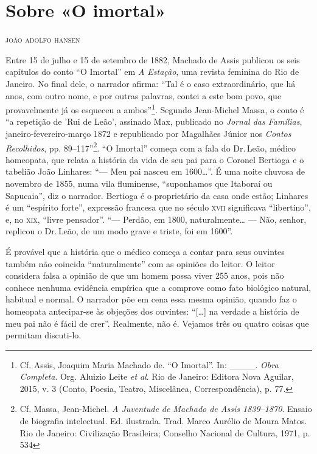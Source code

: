 \chapter[Sobre «O imortal», \emph{por João Adolfo Hansen}]{Sobre «O imortal»} %

\begin{flushright}
\textsc{joão adolfo hansen}
\end{flushright}

\noindent{}Entre 15 de julho e 15 de setembro de 1882, Machado de Assis publicou os
seis capítulos do conto ``O Imortal'' em \emph{A Estação}, uma revista
feminina do Rio de Janeiro. No final dele, o narrador afirma: ``Tal é o
caso extraordinário, que há anos, com outro nome, e por outras palavras,
contei a este bom povo, que provavelmente já os esqueceu a
ambos''\footnote{Cf. Assis, Joaquim Maria Machado de. ``O Imortal''. In:
  \_\_\_\_. \emph{Obra Completa}. Org. Aluizio Leite \emph{et al}. Rio
  de Janeiro: Editora Nova Aguilar, 2015, v. 3 (Conto, Poesia, Teatro,
  Miscelânea, Correspondência), p. 77.}. Segundo Jean-Michel Massa, o
conto é ``a repetição de 'Rui de Leão', assinado Max, publicado no
\emph{Jornal das Famílias}, janeiro-fevereiro-março 1872 e republicado
por Magalhães Júnior nos \emph{Contos Recolhidos}, pp. 89--117''\footnote{Cf.
  Massa, Jean-Michel. \emph{A Juventude de Machado de Assis 1839--1870}.
  Ensaio de biografia intelectual. Ed. ilustrada. Trad. Marco Aurélio de
  Moura Matos. Rio de Janeiro: Civilização Brasileira; Conselho Nacional
  de Cultura, 1971, p. 534}. ``O Imortal'' começa com a fala do Dr.\,Leão,
médico homeopata, que relata a história da vida de seu pai para o
Coronel Bertioga e o tabelião João Linhares: ``--- Meu pai nasceu em
1600\ldots{}''. É uma noite chuvosa de novembro de 1855, numa vila fluminense,
``suponhamos que Itaboraí ou Sapucaia'', diz o narrador. Bertioga é o
proprietário da casa onde estão; Linhares é um ``espírito forte'',
expressão francesa que no século \textsc{xvii} significava ``libertino'', e, no
\textsc{xix}, ``livre pensador''. ``--- Perdão, em 1800, naturalmente\ldots{} --- Não,
senhor, replicou o Dr.\,Leão, de um modo grave e triste, foi em 1600''.

É provável que a história que o médico começa a contar para seus
ouvintes também não coincida ``naturalmente'' com as opiniões do leitor. O
leitor considera falsa a opinião de que um homem possa viver 255 anos,
pois não conhece nenhuma evidência empírica que a comprove como fato
biológico natural, habitual e normal. O narrador põe em cena essa mesma
opinião, quando faz o homeopata antecipar-se às objeções dos ouvintes:
``{[}\ldots{}{]} na verdade a história de meu pai não é fácil de crer''.
Realmente, não é. Vejamos três ou quatro coisas que permitam discuti-lo.

